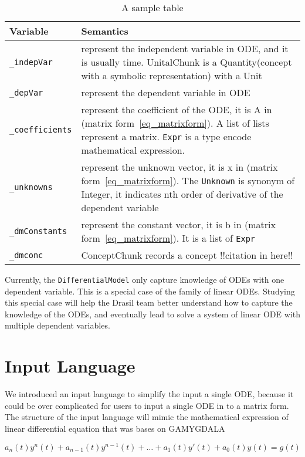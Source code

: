 \begin{table}
	\begin{tabular}{ p{} p{} }
		\textbf{Variable} & \textbf{Semantics} \\
		\toprule
		\verb|_indepVar| & represent the independent variable in ODE, and it is usually time. UnitalChunk is a Quantity(concept with a symbolic representation) with a Unit\\
		\verb|_depVar| & represent the dependent variable in ODE \\
		\verb|_coefficients| & represent the coefficient of the ODE, it is A in (matrix form~\ref{eq_matrixform}). A list of lists represent a matrix. \verb|Expr| is a type encode mathematical expression. \\
		\verb|_unknowns| & represent the unknown vector, it is x in (matrix form~\ref{eq_matrixform}). The \verb|Unknown| is synonym of Integer, it indicates nth order of derivative of the dependent variable \\
		\verb|_dmConstants| & represent the constant vector, it is b in (matrix form~\ref{eq_matrixform}). It is a list of \verb|Expr| \\
		\verb|_dmconc| &  ConceptChunk records a concept !!citation in here!! \\
		\bottomrule	
	\end{tabular}	
	\caption{A sample table}	
	\label{tab_sample}
\end{table}

Currently, the \verb|DifferentialModel| only capture knowledge of ODEs with one dependent variable. This is a special case of the family of linear ODEs. Studying this special case will help the Drasil team better understand how to capture the knowledge of the ODEs, and eventually lead to solve a system of linear ODE with multiple dependent variables.

\section{Input Language}
We introduced an input language to simplify the input a single ODE, because it could be over complicated for users to input a single ODE in to a matrix form. The structure of the input language will mimic the mathematical expression of linear differential equation that was bases on GAMYGDALA~\citep{popescu2014gamygdala}

\begin{equation} \label{eq_linearDE}
	a_n(t)y^n(t) + a_{n-1}(t)y^{n-1}(t) + \dots + a_1(t)y'(t) + a_0(t)y(t) = g(t)
\end{equation}

